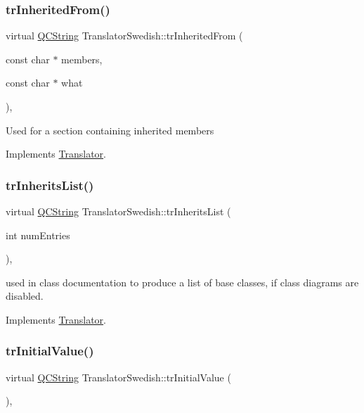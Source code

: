 \subsubsection{\texorpdfstring{trInheritedFrom()}{trInheritedFrom()}}
{\footnotesize\ttfamily virtual \mbox{\hyperlink{class_q_c_string}{Q\+C\+String}} Translator\+Swedish\+::tr\+Inherited\+From (\begin{DoxyParamCaption}\item[{const char $\ast$}]{members,  }\item[{const char $\ast$}]{what }\end{DoxyParamCaption})\hspace{0.3cm}{\ttfamily [inline]}, {\ttfamily [virtual]}}

Used for a section containing inherited members 

Implements \mbox{\hyperlink{class_translator}{Translator}}.

\mbox{\label{class_translator_swedish_a508f42bf4c99305a421894270c9f206b}} 
\subsubsection{\texorpdfstring{trInheritsList()}{trInheritsList()}}
{\footnotesize\ttfamily virtual \mbox{\hyperlink{class_q_c_string}{Q\+C\+String}} Translator\+Swedish\+::tr\+Inherits\+List (\begin{DoxyParamCaption}\item[{int}]{num\+Entries }\end{DoxyParamCaption})\hspace{0.3cm}{\ttfamily [inline]}, {\ttfamily [virtual]}}

used in class documentation to produce a list of base classes, if class diagrams are disabled. 

Implements \mbox{\hyperlink{class_translator}{Translator}}.

\mbox{\label{class_translator_swedish_a5c838b3ffe13947b694a82ecb27893f4}} 
\subsubsection{\texorpdfstring{trInitialValue()}{trInitialValue()}}
{\footnotesize\ttfamily virtual \mbox{\hyperlink{class_q_c_string}{Q\+C\+String}} Translator\+Swedish\+::tr\+Initial\+Value (\begin{DoxyParamCaption}{ }\end{DoxyParamCaption})\hspace{0.3cm}{\ttfamily [inline]}, {\ttfamily [virtual]}}


